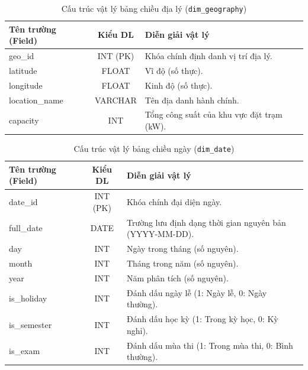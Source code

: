 \documentclass[12pt, a4paper]{report}
\begin{document}
\begin{table}[H]
\centering
\caption{Cấu trúc vật lý bảng chiều địa lý (\texttt{dim\_geography})}
\label{tab:dim_geography}
\renewcommand{\arraystretch}{1.4}
\begin{tabularx}{\textwidth}{p{4.5cm} c X}
\toprule
\textbf{Tên trường (Field)} & \textbf{Kiểu DL} & \textbf{Diễn giải vật lý} \\
\midrule
geo\_id        & INT (PK) & Khóa chính định danh vị trí địa lý. \\
latitude      & FLOAT    & Vĩ độ (số thực). \\
longitude     & FLOAT    & Kinh độ (số thực). \\
location\_name & VARCHAR  & Tên địa danh hành chính. \\
capacity      & INT      & Tổng công suất của khu vực đặt trạm (kW). \\
\bottomrule
\end{tabularx}
\end{table}

\begin{table}[H]
\centering
\caption{Cấu trúc vật lý bảng chiều ngày (\texttt{dim\_date})}
\label{tab:dim_date}
\renewcommand{\arraystretch}{1.4}
\begin{tabularx}{\textwidth}{p{4.5cm} c X}
\toprule
\textbf{Tên trường (Field)} & \textbf{Kiểu DL} & \textbf{Diễn giải vật lý} \\
\midrule
date\_id       & INT (PK) & Khóa chính đại diện ngày. \\
full\_date     & DATE     & Trường lưu định dạng thời gian nguyên bản (YYYY-MM-DD). \\
day            & INT      & Ngày trong tháng (số nguyên). \\
month          & INT      & Tháng trong năm (số nguyên). \\
year           & INT      & Năm phân tích (số nguyên). \\
is\_holiday    & INT      & Đánh dấu ngày lễ (1: Ngày lễ, 0: Ngày thường). \\
is\_semester   & INT      & Đánh dấu học kỳ (1: Trong kỳ học, 0: Kỳ nghỉ). \\
is\_exam       & INT      & Đánh dấu mùa thi (1: Trong mùa thi, 0: Bình thường). \\
\bottomrule
\end{tabularx}
\end{table}
\end{document}
